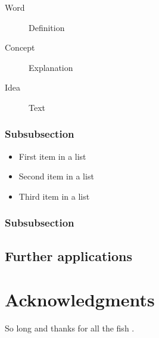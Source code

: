 \documentclass[fleqn,12pt]{SelfArx} %
\begin{document}
\lipsum[12] %

\begin{description}
\item[Word] Definition
\item[Concept] Explanation
\item[Idea] Text
\end{description}

\subsubsection{Subsubsection}

\lipsum[13] %

\begin{itemize}[noitemsep] %
\item First item in a list
\item Second item in a list
\item Third item in a list
\end{itemize}

\subsubsection{Subsubsection}

\lipsum[14] %

\subsection{Further applications}

\lipsum[15-23] %

\section*{Acknowledgments} %


So long and thanks for all the fish \cite{Cavigelli:2017:CCI:3131885.3131906}.




\end{document}
